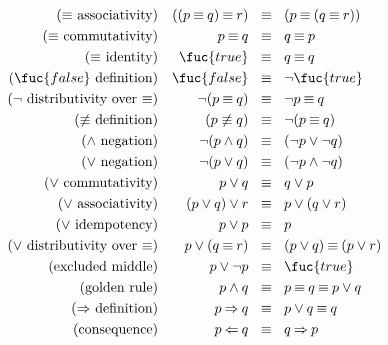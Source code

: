 \documentclass{beamer}
\def\true{\fuc{true}}
\def\false{\fuc{false}}
\def\dimp{\mathbin{\equiv}}
\def\imp{\mathbin{\Rightarrow}}
\def\rimp{\mathbin{\Leftarrow}}
\def\e{\mathbin{\wedge}}
\def\ou{\mathbin{\vee}}
\begin{document}
\begin{slide}{}
  ~\\[-15mm]
  \begin{align*}
\text{($\dimp$ associativity)} && ((p \dimp q) \dimp r) &~~\dimp~~ (p \dimp (q \dimp r))\\
\text{($\dimp$ commutativity)} &&  p \dimp q &~~\dimp~~ q \dimp p \\
\text{($\dimp$ identity)} &&  \true &~~\dimp~~ q \dimp q\\
\text{($\false$ definition)} && \false &~~\dimp~~ \neg \true\\
\text{($\neg$ distributivity over $\dimp$)} &&  \neg(p \dimp q) &~~\dimp~~ \neg p \dimp q\\
\text{($\not\equiv$ definition)} &&  (p \not\equiv q) &~~\dimp~~ \neg(p \dimp q)\\
\text{($\e$ negation)} && \neg (p \e q) &~~\dimp~~ (\neg p \ou \neg q)\\
\text{($\ou$ negation)} && \neg (p \ou q) &~~\dimp~~ (\neg p \e \neg q)\\
\text{($\ou$ commutativity)} && p \ou q &~~\dimp~~ q \ou p\\
\text{($\ou$ associativity)} && (p \ou q) \ou r &~~\dimp~~ p\ou (q \ou r)\\
\text{($\ou$ idempotency)} && p \ou p &~~\dimp~~ p\\
\text{($\ou$ distributivity over $\dimp$)} &&  p \ou (q \dimp r) &~~\dimp~~ (p\ou q) \dimp (p \ou r)  \\
\text{(excluded middle)} &&  p \ou \neg p &~~\dimp~~ \true \\
\text{(golden rule)} && p \e q &~~\dimp~~ p \dimp q \dimp p \ou q\\
\text{($\imp$ definition)} && p \imp q &~~\dimp~~ p \ou q \dimp q\\
\text{(consequence)} &&  p \rimp q &~~\dimp~~ q \imp p
  \end{align*}
\end{slide}



\end{document}
